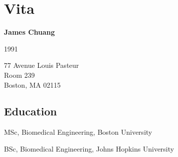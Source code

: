 
\chapter*{Vita}

\textbf{James Chuang}

\begin{description}[align=right, labelwidth=4cm, noitemsep, leftmargin=!]
    \item [year of birth:] 1991
    \item [contact address:] 77 Avenue Louis Pasteur\\
                             Room 239\\
                             Boston, MA 02115
\end{description}
\noindent\hrulefill

\section*{Education}
\begin{description}[align=right, labelwidth=1.5cm, noitemsep, leftmargin=!]
    \item [2018] MSc, Biomedical Engineering, Boston University
    \item [2013] BSc, Biomedical Engineering, Johns Hopkins University
\end{description}


